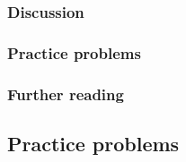 




\subsubsection*{Discussion}

\subsubsection*{Practice problems}

\subsubsection*{Further reading}

\subsection{Practice problems}
